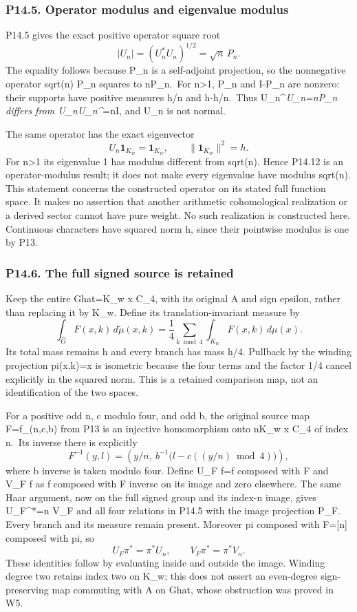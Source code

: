 \documentclass[
  11pt,
]{article}
\begin{document}
\subsubsection{P14.5. Operator modulus and eigenvalue
modulus}\label{p14.5.-operator-modulus-and-eigenvalue-modulus}

P14.5 gives the exact positive operator square root \[
|U_n|=(U_n^*U_n)^{1/2}=\sqrt n\,P_n.
\tag{P14.12}
\] The equality follows because P\_n is a self-adjoint projection, so
the nonnegative operator sqrt(n) P\_n squares to nP\_n.~For
n\textgreater1, P\_n and I-P\_n are nonzero: their supports have
positive measures h/n and h-h/n.~Thus U\_n\^{}\emph{U\_n=nP\_n differs
from U\_nU\_n\^{}}=nI, and U\_n is not normal.

The same operator has the exact eigenvector \[
U_n\mathbf1_{K_w}=\mathbf1_{K_w},\qquad
\|\mathbf1_{K_w}\|^2=h.
\tag{P14.13}
\] For n\textgreater1 its eigenvalue 1 has modulus different from
sqrt(n). Hence P14.12 is an operator-modulus result; it does not make
every eigenvalue have modulus sqrt(n). This statement concerns the
constructed operator on its stated full function space. It makes no
assertion that another arithmetic cohomological realization or a derived
sector cannot have pure weight. No such realization is constructed here.
Continuous characters have squared norm h, since their pointwise modulus
is one by P13.

\subsubsection{P14.6. The full signed source is
retained}\label{p14.6.-the-full-signed-source-is-retained}

Keep the entire Ghat=K\_w x C\_4, with its original A and sign epsilon,
rather than replacing it by K\_w. Define its translation-invariant
measure by \[
\int_{\widehat G}F(x,k)\,d\widetilde\mu(x,k)
=\frac14\sum_{k\bmod4}\int_{K_w}F(x,k)\,d\mu(x).
\tag{P14.14}
\] Its total mass remains h and every branch has mass h/4. Pullback by
the winding projection pi(x,k)=x is isometric because the four terms and
the factor 1/4 cancel explicitly in the squared norm. This is a retained
comparison map, not an identification of the two spaces.

For a positive odd n, c modulo four, and odd b, the original source map
F=f\_(n,c,b) from P13 is an injective homomorphism onto nK\_w x C\_4 of
index n.~Its inverse there is explicitly \[
F^{-1}(y,l)=\left(y/n,\ b^{-1}\bigl(l-c((y/n)\bmod4)\bigr)\right),
\tag{P14.15}
\] where b inverse is taken modulo four. Define U\_F f=f composed with F
and V\_F f as f composed with F inverse on its image and zero elsewhere.
The same Haar argument, now on the full signed group and its index-n
image, gives U\_F\^{}*=n V\_F and all four relations in P14.5 with the
image projection P\_F. Every branch and its measure remain present.
Moreover pi composed with F={[}n{]} composed with pi, so \[
U_F\pi^*=\pi^*U_n,\qquad V_F\pi^*=\pi^*V_n.
\tag{P14.16}
\] These identities follow by evaluating inside and outside the image.
Winding degree two retains index two on K\_w; this does not assert an
even-degree sign-preserving map commuting with A on Ghat, whose
obstruction was proved in W5.
\end{document}
